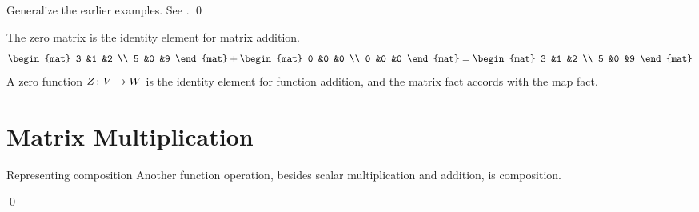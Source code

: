 \begin{frame}
\th[th:MatOpsRepMapOps]

\pause
\pf
Generalize the earlier examples.
See \hspace{-0.25em}.
\qed

\pause
\medskip
\df[df:ZeroMatrix]

\pause
\medskip
\ex
The zero matrix is the identity element for matrix addition.
\begin{equation*}
  \begin{mat}
    3 &1 &2 \\
    5 &0 &9
  \end{mat}
  +
  \begin{mat}
    0 &0 &0 \\
    0 &0 &0
  \end{mat}
  =
  \begin{mat}
    3 &1 &2 \\
    5 &0 &9
  \end{mat}
\end{equation*}
A zero function
$\mbox{$Z\colon V\to W$}$ is the identity element for
function addition, and the matrix fact accords with the map fact. 
\end{frame}




\section{Matrix Multiplication}
\begin{frame}{Representing composition}
Another function operation,
besides scalar multiplication and addition,   
is composition.

\pause
\lm[lm:CompositionOfLinearMapsIsLinear]

\pause
\pf
{}
\qed

\end{frame}




